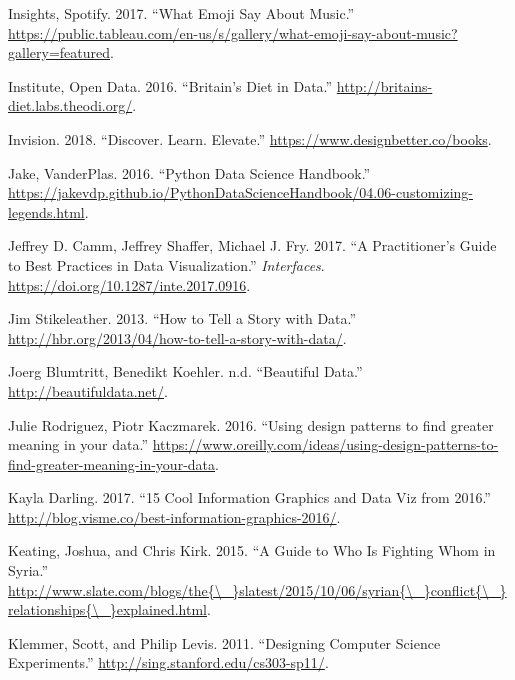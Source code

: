 \documentclass[]{book}
\begin{document}
\leavevmode\hypertarget{ref-artist_emoji}{}%
Insights, Spotify. 2017. ``What Emoji Say About Music.'' \url{https://public.tableau.com/en-us/s/gallery/what-emoji-say-about-music?gallery=featured}.

\leavevmode\hypertarget{ref-britain_diet_2016}{}%
Institute, Open Data. 2016. ``Britain's Diet in Data.'' \url{http://britains-diet.labs.theodi.org/}.

\leavevmode\hypertarget{ref-invision}{}%
Invision. 2018. ``Discover. Learn. Elevate.'' \url{https://www.designbetter.co/books}.

\leavevmode\hypertarget{ref-PythonDataScienceHandbook}{}%
Jake, VanderPlas. 2016. ``Python Data Science Handbook.'' \url{https://jakevdp.github.io/PythonDataScienceHandbook/04.06-customizing-legends.html}.

\leavevmode\hypertarget{ref-practitioners_guide}{}%
Jeffrey D. Camm, Jeffrey Shaffer, Michael J. Fry. 2017. ``A Practitioner's Guide to Best Practices in Data Visualization.'' \emph{Interfaces}. \url{https://doi.org/10.1287/inte.2017.0916}.

\leavevmode\hypertarget{ref-storytelling_with_data}{}%
Jim Stikeleather. 2013. ``How to Tell a Story with Data.'' \url{http://hbr.org/2013/04/how-to-tell-a-story-with-data/}.

\leavevmode\hypertarget{ref-Beautiful_data}{}%
Joerg Blumtritt, Benedikt Koehler. n.d. ``Beautiful Data.'' \url{http://beautifuldata.net/}.

\leavevmode\hypertarget{ref-greater}{}%
Julie Rodriguez, Piotr Kaczmarek. 2016. ``Using design patterns to find greater meaning in your data.'' \url{https://www.oreilly.com/ideas/using-design-patterns-to-find-greater-meaning-in-your-data}.

\leavevmode\hypertarget{ref-cool_data}{}%
Kayla Darling. 2017. ``15 Cool Information Graphics and Data Viz from 2016.'' \url{http://blog.visme.co/best-information-graphics-2016/}.

\leavevmode\hypertarget{ref-syria_chart}{}%
Keating, Joshua, and Chris Kirk. 2015. ``A Guide to Who Is Fighting Whom in Syria.'' \href{http://www.slate.com/blogs/the\%7B/_\%7Dslatest/2015/10/06/syrian\%7B/_\%7Dconflict\%7B/_\%7Drelationships\%7B/_\%7Dexplained.html}{http://www.slate.com/blogs/the\{\textbackslash{}\_\}slatest/2015/10/06/syrian\{\textbackslash{}\_\}conflict\{\textbackslash{}\_\}relationships\{\textbackslash{}\_\}explained.html}.

\leavevmode\hypertarget{ref-stanford_course}{}%
Klemmer, Scott, and Philip Levis. 2011. ``Designing Computer Science Experiments.'' \url{http://sing.stanford.edu/cs303-sp11/}.
\end{document}
